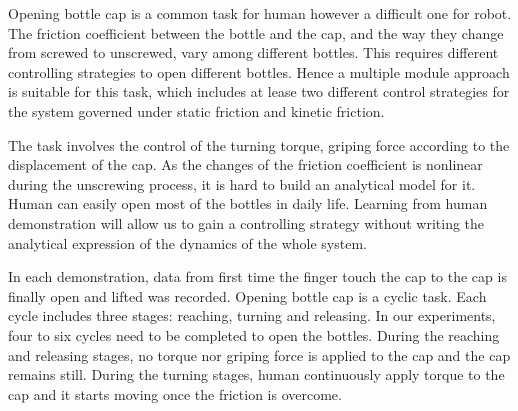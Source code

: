 \documentclass[preprint,12pt]{elsarticle}
\begin{document}

Opening bottle cap is a common task for human however a difficult one for robot. The friction coefficient between the bottle and the cap, and the way they change from screwed to unscrewed, vary among different bottles. This requires different controlling strategies to open different bottles. Hence a multiple module approach is suitable for this task, which includes at lease two different control strategies for the system governed under static friction and kinetic friction.

The task involves the control of the turning torque, griping force according to the displacement of the cap. As the changes of the friction coefficient is nonlinear during the unscrewing process, it is hard to build an analytical model for it. Human can easily open most of the bottles in daily life. Learning from human demonstration will allow us to gain a controlling strategy without writing the analytical expression of the dynamics of the whole system.

In each demonstration, data from first time the finger touch the cap to the cap is finally open and lifted was recorded. Opening bottle cap is a cyclic task. Each cycle includes three stages: reaching, turning and releasing. In our experiments, four to six cycles need to be completed to open the bottles. During the reaching and releasing stages, no torque nor griping force is applied to the cap and the cap remains still. During the turning stages, human continuously apply torque to the cap and it starts moving once the friction is overcome.
\end{document}
